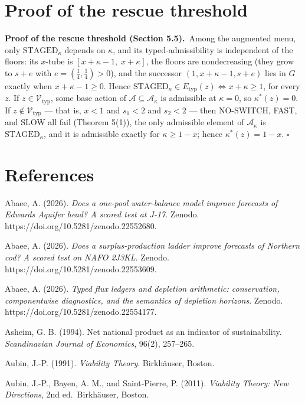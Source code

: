 \documentclass[review,11pt]{elsarticle}
\begin{document}
\section{Proof of the rescue threshold}

\textbf{Proof of the rescue threshold (Section 5.5).}\ Among the augmented menu, only \(\mathrm{STAGED}_\kappa\) depends on \(\kappa\), and its typed-admissibility is independent of the floors: its \(x\)-tube is \([x + \kappa - 1,\; x + \kappa]\), the floors are nondecreasing (they grow to \(s + e\) with \(e = (\tfrac14, \tfrac14) > 0\)), and the successor \((1, x + \kappa - 1, s + e)\) lies in \(G\) exactly when \(x + \kappa - 1 \ge 0\). Hence \(\mathrm{STAGED}_\kappa \in E_{\mathrm{typ}}(z) \iff x + \kappa \ge 1\), for every \(z\). If \(z \in \mathcal{V}_{\mathrm{typ}}\), some base action of \(\mathcal{A} \subseteq \mathcal{A}_\kappa\) is admissible at \(\kappa = 0\), so \(\kappa^*(z) = 0\). If \(z \notin \mathcal{V}_{\mathrm{typ}}\) --- that is, \(x < 1\) and \(s_1 < 2\) and \(s_2 < 2\) --- then NO-SWITCH, FAST, and SLOW all fail (Theorem 5(1)), the only admissible element of \(\mathcal{A}_\kappa\) is \(\mathrm{STAGED}_\kappa\), and it is admissible exactly for \(\kappa \ge 1 - x\); hence \(\kappa^*(z) = 1 - x\). \ensuremath{\square}


\section*{References}\label{references}

Abaee, A. (2026). \emph{Does a one-pool water-balance model improve forecasts of Edwards Aquifer head? A scored test at J-17}. Zenodo. https://doi.org/10.5281/zenodo.22552680.

Abaee, A. (2026). \emph{Does a surplus-production ladder improve forecasts of Northern cod? A scored test on NAFO 2J3KL}. Zenodo. https://doi.org/10.5281/zenodo.22553609.

Abaee, A. (2026). \emph{Typed flux ledgers and depletion arithmetic: conservation, componentwise diagnostics, and the semantics of depletion horizons}. Zenodo. https://doi.org/10.5281/zenodo.22554177.

Asheim, G. B. (1994). Net national product as an indicator of sustainability. \emph{Scandinavian Journal of Economics}, 96(2), 257--265.

Aubin, J.-P. (1991). \emph{Viability Theory}. Birkh\"auser, Boston.

Aubin, J.-P., Bayen, A. M., and Saint-Pierre, P. (2011). \emph{Viability Theory: New Directions}, 2nd ed.~Birkh\"auser, Boston.
\end{document}
